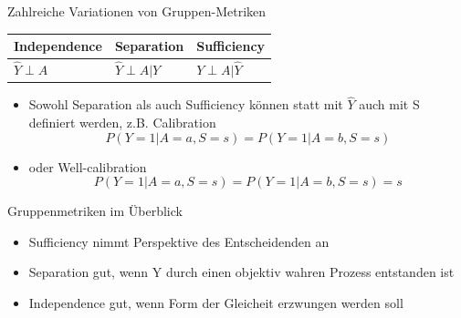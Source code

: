 \documentclass[aspectratio=169]{beamer}
\begin{document}
\begin{frame}[t]{Zahlreiche Variationen von Gruppen-Metriken}
	\begin{table}
		\begin{tabular}{lll}
			\toprule
			Independence & Separation & {Sufficiency} \\
			\midrule
			$\hat{Y} \perp A$ & $\hat{Y} \perp A | Y$ & {$Y \perp A | \hat{Y}$}\\
			\bottomrule
		\end{tabular}
	\end{table}
	\begin{itemize}
		\item<2-> Sowohl Separation als auch Sufficiency können statt mit $\hat{Y}$ auch mit S definiert werden, z.B. Calibration 	$$P(Y = 1 | A = a, S = s) = P(Y = 1 | A = b, S = s)$$
		\item<3-> oder Well-calibration $$P(Y = 1 | A = a, S = s) = P(Y = 1 | A = b, S = s) = s$$
	\end{itemize}

\end{frame}

\begin{frame}{Gruppenmetriken im Überblick}
	\begin{itemize}
		\item Sufficiency nimmt Perspektive des Entscheidenden an
		\item Separation gut, wenn Y durch einen objektiv wahren Prozess entstanden ist
		\item Independence gut, wenn Form der Gleicheit erzwungen werden soll %
	\end{itemize}
	\vspace*{0.5cm}
\end{frame}
\end{document}
